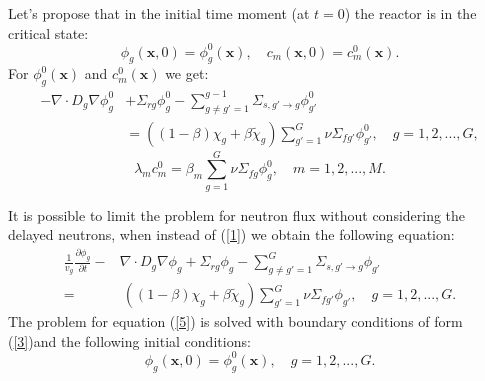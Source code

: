 \documentclass[authoryear]{elsarticle}
\begin{document}
Let’s propose that in the initial time moment (at $t=0$) the reactor is in the critical state:
\begin{equation}\label{4}
 \phi_g(\bm x,0) = \phi_g^0(\bm x), 
 \quad c_m(\bm x,0) = c_m^0(\bm x) . 
\end{equation} 
For $\phi_g^0(\bm x)$ and $c_m^0(\bm x)$ we get:
\[
 \begin{split}
 - \nabla \cdot D_g \nabla \phi_g^0 & + \Sigma_{rg} \phi_g^0 
 - \sum_{g\neq g'=1}^{g-1} \Sigma_{s,g'\rightarrow g} \phi_{g'}^0 \\
 & = ( (1-\beta) \chi_g + \beta \widetilde{\chi}_g) \sum_{g'=1}^{G} \nu \Sigma_{fg'} \phi_{g'}^0 , \quad 
 g = 1,2, ..., G ,
\end{split}
\] 
\[
 \lambda_m c_m^0 = \beta_m \sum_{g=1}^{G} \nu \Sigma_{fg} \phi_g^0 ,
 \quad m = 1,2, ..., M .
\] 

It is possible to limit the problem for neutron flux without considering the delayed neutrons, when instead of  (\ref{1}) we obtain the following equation:
 \begin{equation}\label{5}
\begin{split}
 \frac{1}{v_g} \frac{\partial \phi_g}{\partial t} - & \nabla \cdot D_g \nabla \phi_g + \Sigma_{rg} \phi_g 
 - \sum_{g\neq g'=1}^{G} \Sigma_{s,g'\rightarrow g} \phi_{g'} \\
 =  & \ ( (1-\beta) \chi_g + \beta \widetilde{\chi}_g) \sum_{g'=1}^{G} \nu \Sigma_{fg'} \phi_{g'} , \quad 
 g = 1,2, ..., G .
\end{split}
\end{equation} 
The problem for equation (\ref{5}) is solved with boundary conditions of form (\ref{3})and the following initial conditions:
\begin{equation}\label{6}
 \phi_g(\bm x,0) = \phi_g^0(\bm x), 
 \quad  g = 1,2, ..., G .
\end{equation} 
\end{document}
